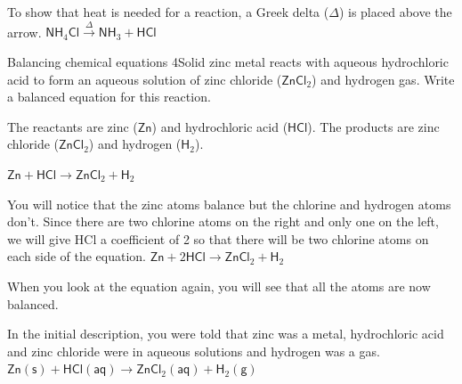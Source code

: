 \label{m38727*eip-536}To show that heat is needed for a reaction, a Greek delta ($\Delta $) is placed above the arrow.
$\mathsf{NH}_{4}\mathsf{Cl} \xrightarrow{\Delta} \mathsf{NH}_{3} + \mathsf{HCl}$ 
	\par
\label{m38727*secfhsst!!!underscore!!!id967}\vspace{.5cm} 
      \noindent
\begin{wex}{Balancing chemical equations 4}{Solid zinc metal reacts with aqueous hydrochloric acid to form an aqueous solution of zinc chloride ($\mathsf{ZnCl}_{2}$) and hydrogen gas. Write a balanced equation for this reaction.}

{
The reactants are zinc ($\mathsf{Zn}$) and hydrochloric acid ($\mathsf{HCl}$). The products are zinc chloride ($\mathsf{ZnCl}_{2}$) and hydrogen ($\mathsf{H}_{2}$).\\
}

{
${\mathsf{Zn} + \mathsf{HCl} \rightarrow \mathsf{ZnCl}_{2} + \mathsf{H}_{2}}$
}

{
You will notice that the zinc atoms balance but the chlorine and hydrogen atoms don't. Since there are two chlorine atoms on the right and only one on the left, we will give HCl a coefficient of 2 so that there will be two chlorine atoms on each side of the equation.
${\mathsf{Zn} + 2\mathsf{HCl} \rightarrow \mathsf{ZnCl}_{2} + \mathsf{H}_{2}}$
}

{
When you look at the equation again, you will see that all the atoms are now balanced.
}

{
In the initial description, you were told that zinc was a metal, hydrochloric acid and zinc chloride were in aqueous solutions and hydrogen was a gas.
$\mathsf{Zn (s)} + \mathsf{HCl (aq)} \rightarrow \mathsf{ZnCl}_{2} \mathsf{(aq)} + \mathsf{H}_{2} \mathsf{(g)}$
}
\end{wex}
    \noindent
\par

